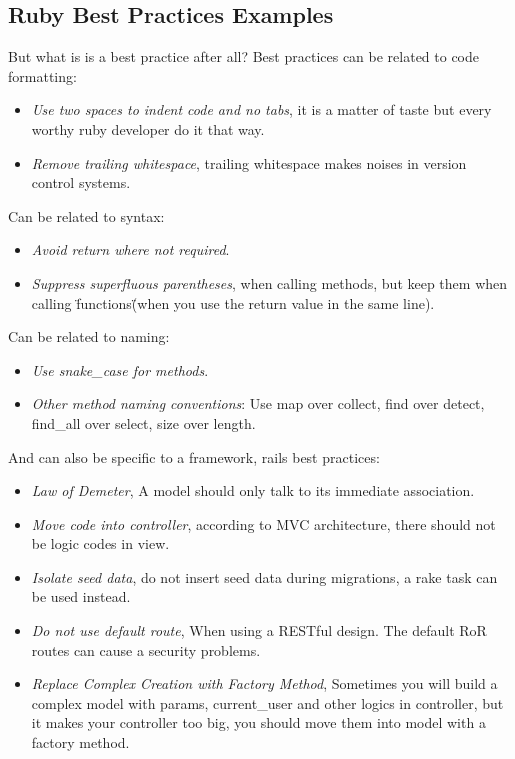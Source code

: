 \documentclass[sle]{llncs}
\begin{document}
\subsection{Ruby Best Practices Examples}
But what is is a best practice after all?
Best practices can be related to code formatting:
\begin{itemize}
\item \emph{Use two spaces to indent code and no tabs}, it is a matter of taste but every worthy ruby developer do it that way.
\item \emph{Remove trailing whitespace}, trailing whitespace makes noises in version control systems.
\end{itemize}

Can be related to syntax:
\begin{itemize}
\item \emph{Avoid return where not required}.
\item \emph{Suppress superfluous parentheses}, when calling methods, but keep them when calling \"functions\" (when you use the return value in the
  same line).
\end{itemize}

Can be related to naming:
\begin{itemize}
\item \emph{Use snake\_case for methods}.
\item \emph{Other method naming conventions}: Use map over collect, find over detect, find\_all over select, size over length.
\end{itemize}

And can also be specific to a framework, rails best practices:
\begin{itemize}
\item \emph{Law of Demeter}, A model should only talk to its immediate association.
\item \emph{Move code into controller}, according to MVC architecture, there should not be logic codes in view.
\item \emph{Isolate seed data}, do not insert seed data during migrations, a rake task can be used instead.
\item \emph{Do not use default route}, When using a RESTful design. The default RoR routes can cause a security problems.
\item \emph{Replace Complex Creation with Factory Method}, Sometimes you will build a complex model with params, current\_user and other logics in controller, but it makes your controller too big, you should move them into model with a factory method.
\end{itemize}
\end{document}
